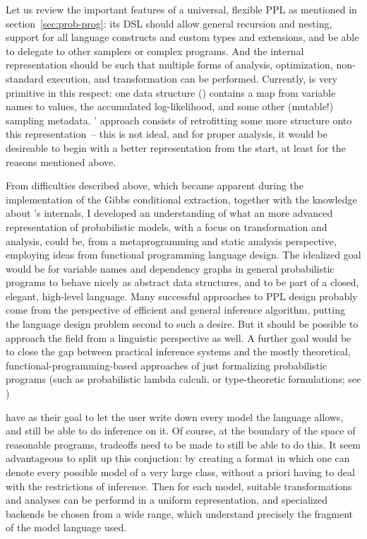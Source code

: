 Let us review the important features of a universal, flexible PPL as mentioned in
section~\ref{sec:prob-prog}: its DSL should allow general recursion and nesting, support for all
language constructs and custom types and extensions, and be able to delegate to other samplers or
complex programs.  And the internal representation should be such that multiple forms of analysis,
optimization, non-standard execution, and transformation can be performed.  Currently, \turingjl{}
is very primitive in this respect: one data structure () contains a map from variable
names to values, the accumulated log-likelihood, and some other (mutable!) sampling
metadata. \autogibbsjl{}' approach consists of retrofitting some more structure onto this
representation~-- this is not ideal, and for proper analysis, it would be desireable to begin with a
better representation from the start, at least for the reasons mentioned above.

From difficulties described above, which became apparent during the implementation of the Gibbs
conditional extraction, together with the knowledge about \dppljl{}'s internals, I developed an
understanding of what an more advanced representation of probabilistic models, with a focus on
transformation and analysis, could be, from a metaprogramming and static analysis perspective,
employing ideas from functional programming language design.  The idealized goal would be for
variable names and dependency graphs in general probabilistic programs to behave nicely as abstract
data structures, and to be part of a closed, elegant, high-level language.  Many successful
approaches to PPL design probably come from the perspective of efficient and general inference
algorithm, putting the language design problem second to such a desire.  But it should be possible
to approach the field from a linguistic perspective as well.  A further goal would be to close the
gap between practical inference systems and the mostly theoretical, functional-programming-based
approaches of just formalizing probabilistic programs (such as probabilistic lambda calculi, or
type-theoretic formulations; see
\textcite{ramsey2002stochastic,heunen2017convenient,bhat2012type,scibior2015practical})

 have as their goal to let the user write down every model the language
allows, and still be able to do inference on it.  Of course, at the boundary of the space of
reasonable programs, tradeoffs need to be made to still be able to do this.  It seem advantageous to
split up this conjuction: by creating a format in which one can denote every possible model of a
very large class, without a priori having to deal with the restrictions of inference.  Then for each
model, suitable transformations and analyses can be performd in a uniform representation, and
specialized backends be chosen from a wide range, which understand precisely the fragment of the
model language used.

